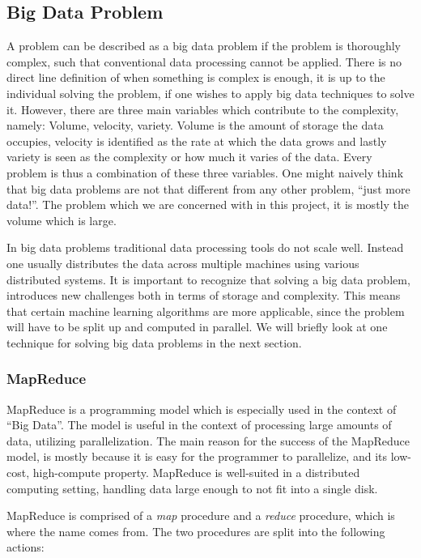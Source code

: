 \subsection{Big Data Problem}
A problem can be described as a big data problem if the problem is thoroughly complex, such that conventional data processing cannot be applied. There is no direct line definition of when something is complex is enough, it is up to the individual solving the problem, if one wishes to apply big data techniques to solve it. However, there are three main variables which contribute to the complexity, namely: Volume, velocity, variety. Volume is the amount of storage the data occupies, velocity is identified as the rate at which the data grows and lastly variety is seen as the complexity or how much it varies of the data. 
Every problem is thus a combination of these three variables. One might naively think that big data problems are not that different from any other problem, ``just more data!''. The problem which we are concerned with in this project, it is mostly the volume which is large. 

In big data problems traditional data processing tools do not scale well. Instead one usually distributes the data across multiple machines using various distributed systems. It is important to recognize that solving a big data problem, introduces new challenges both in terms of storage and complexity. This means that certain machine learning algorithms are more applicable, since the problem will have to be split up and computed in parallel.  We will briefly look at one technique for solving big data problems in the next section.

\subsubsection{MapReduce} %
\label{sec:mapreduce_programming_model}

MapReduce is a programming model which is especially used in the context of ``Big Data''. The model is useful in the context of processing large amounts of data, utilizing parallelization. The main reason for the success of the MapReduce model, is mostly because it is easy for the programmer to parallelize, and its low-cost, high-compute property. MapReduce is well-suited in a distributed computing setting, handling data large enough to not fit into a single disk.

MapReduce is comprised of a \emph{map} procedure and a \emph{reduce} procedure, which is where the name comes from. The two procedures are split into the following actions:


